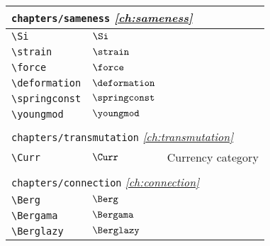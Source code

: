 \begin{longtable}{lll}
  \multicolumn{3}{l}{{\color[rgb]{0.5,0.5,0.5}\texttt{chapters/sameness}} \emph{\cref{ch:sameness}}}
  \\
  \hline
  {\color[rgb]{0.5,0.5,0.5}\texttt{\textbackslash Si}}                                                      & $\Si$                      & \\
  {\color[rgb]{0.5,0.5,0.5}\texttt{\textbackslash strain}}                                                  & $\strain$                  & \\
  {\color[rgb]{0.5,0.5,0.5}\texttt{\textbackslash force}}                                                   & $\force$                   & \\
  {\color[rgb]{0.5,0.5,0.5}\texttt{\textbackslash deformation}}                                             & $\deformation$             & \\
  {\color[rgb]{0.5,0.5,0.5}\texttt{\textbackslash springconst}}                                             & $\springconst$             & \\
  {\color[rgb]{0.5,0.5,0.5}\texttt{\textbackslash youngmod}}                                                & $\youngmod$                &                                                         \\
  &                            &                                                         \\
  \multicolumn{3}{l}{{\color[rgb]{0.5,0.5,0.5}\texttt{chapters/transmutation}} \emph{\cref{ch:transmutation}}}
  \\
  \hline
  {\color[rgb]{0.5,0.5,0.5}\texttt{\textbackslash Curr}}                                                    & $\Curr$                    & Currency category                                       \\
  &                            &                                                         \\
  \multicolumn{3}{l}{{\color[rgb]{0.5,0.5,0.5}\texttt{chapters/connection}} \emph{\cref{ch:connection}}}
  \\
  \hline
  {\color[rgb]{0.5,0.5,0.5}\texttt{\textbackslash Berg}}                                                    & $\Berg$                    & \\
  {\color[rgb]{0.5,0.5,0.5}\texttt{\textbackslash Bergama}}                                                 & $\Bergama$                 & \\
  {\color[rgb]{0.5,0.5,0.5}\texttt{\textbackslash Berglazy}}                                                & $\Berglazy$                & \\

\end{longtable}
